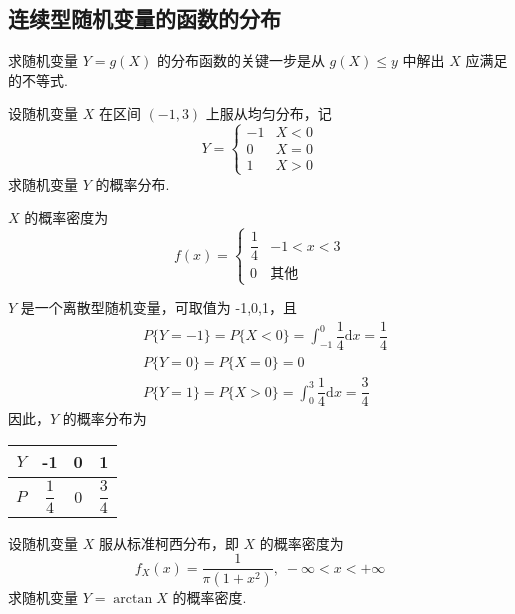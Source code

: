 \subsection{连续型随机变量的函数的分布}

求随机变量 $Y=g(X)$ 的分布函数的关键一步是从 $g(X) \leqslant y$ 中解出 $X$ 应满足的不等式.

\begin{problem}
    设随机变量 $X$ 在区间 $(-1,3)$ 上服从均匀分布，记
    $$
    Y=\begin{cases}
        -1 & X<0 \\
        0 & X=0 \\
        1 & X>0
    \end{cases}
    $$
    求随机变量 $Y$ 的概率分布.
\end{problem}

\begin{solution}
    $X$ 的概率密度为
    $$
    f(x)=\begin{cases}
        \dfrac{1}{4} & -1 < x < 3\\
        0 & \text{其他}
    \end{cases}
    $$

    $Y$ 是一个离散型随机变量，可取值为 -1,0,1，且
    \begin{align*}
        & P\{Y=-1\} = P\{X<0\} = \int_{-1}^0 \dfrac{1}{4}\text{d}x = \dfrac{1}{4} \\
        & P\{Y=0\} = P\{X=0\} = 0 \\
        & P\{Y=1\} = P\{X>0\} = \int_0^3 \dfrac{1}{4}\text{d}x = \dfrac{3}{4}
    \end{align*}
    因此，$Y$ 的概率分布为\newline

    \centering
    \begin{tabular}{c | c c c}
        \hline
        $Y$ & -1 & 0 & 1 \\
        \hline
        \rule{0pt}{20pt}$P$ & $\dfrac{1}{4}$ & 0 & $\dfrac{3}{4}$ \\[4pt]
        \hline
    \end{tabular}
\end{solution}

\begin{problem}
    设随机变量 $X$ 服从标准柯西分布，即 $X$ 的概率密度为
    $$
    f_{X}(x) = \dfrac{1}{\pi (1+x^2)}, \; -\infty < x < +\infty
    $$
    求随机变量 $Y=\arctan X$ 的概率密度.
\end{problem}

